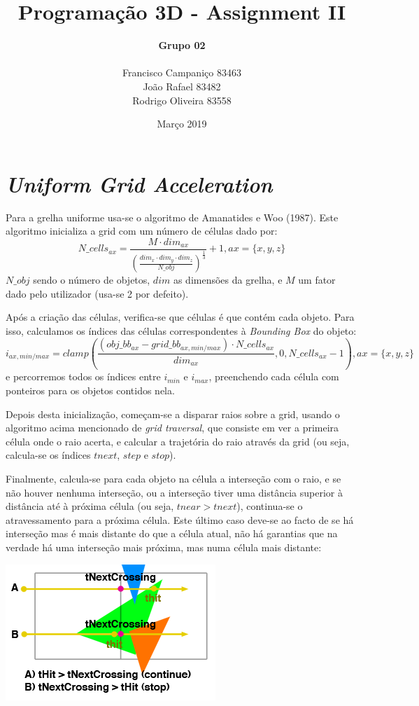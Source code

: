 \documentclass{article}
\title{
    \textbf{Programação 3D - Assignment II}
    }
\author{
    \begin{Large}
        \textbf{Grupo 02}
    \end{Large}\\
    Francisco Campaniço 83463\\
    João Rafael 83482\\
    Rodrigo Oliveira 83558
}
\date{Março 2019}
\begin{document}
    \maketitle

    \section*{\textit{Uniform Grid Acceleration}}
        \par
        Para a grelha uniforme usa-se o algoritmo de Amanatides e Woo (1987). Este algoritmo inicializa a grid com um número de células dado por: 
        $$N\_cells_{ax} = \frac{M \cdot dim_{ax}}{(\frac{dim_x \cdot dim_y \cdot dim_z}{N\_obj})^{\frac{1}{3}}} + 1, ax = \{x,y,z\}$$
        $N\_obj$ sendo o número de objetos, $dim$ as dimensões da grelha, e $M$ um fator dado pelo utilizador (usa-se 2 por defeito).
        \par
        Após a criação das células, verifica-se que células é que contém cada objeto. Para isso, calculamos os índices das células correspondentes à \textit{Bounding Box} do objeto:
        $$i_{ax,min/max} = clamp(\frac{(obj\_bb_{ax} - grid\_bb_{ax,min/max})\cdot N\_cells_{ax}}{dim_{ax}},0,N\_cells_{ax} - 1), ax = \{x,y,z\}$$
        e percorremos todos os índices entre $i_{min}$ e $i_{max}$, preenchendo cada célula com ponteiros para os objetos contidos nela.
        \par
        Depois desta inicialização, começam-se a disparar raios sobre a grid, usando o algoritmo acima mencionado de \textit{grid traversal}, que consiste em ver a primeira célula onde o raio acerta, e calcular a trajetória do raio através da grid (ou seja, calcula-se os índices $tnext$, $step$ e $stop$).
        \par
        Finalmente, calcula-se para cada objeto na célula a interseção com o raio, e se não houver nenhuma interseção, ou a interseção tiver uma distância superior à distância até à próxima célula (ou seja, $tnear > tnext$), continua-se o atravessamento para a próxima célula. Este último caso deve-se ao facto de se há interseção mas é mais distante do que a célula atual, não há garantias que na verdade há uma interseção mais próxima, mas numa célula mais distante:
        \begin{center}
            \includegraphics[scale=0.7]{overlap} 
        \end{center}
\end{document}
